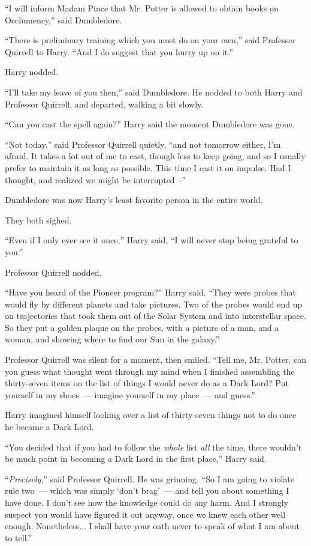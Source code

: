 ``I will inform Madam Pince that Mr. Potter is allowed to obtain books on Occlumency,'' said Dumbledore.

``There is preliminary training which you must do on your own,'' said Professor Quirrell to Harry. ``And I do suggest that you hurry up on it.''

Harry nodded.

``I'll take my leave of you then,'' said Dumbledore. He nodded to both Harry and Professor Quirrell, and departed, walking a bit slowly.

``Can you cast the spell again?'' Harry said the moment Dumbledore was gone.

``Not today,'' said Professor Quirrell quietly, ``and not tomorrow either, I'm afraid. It takes a lot out of me to cast, though less to keep going, and so I usually prefer to maintain it as long as possible. This time I cast it on impulse. Had I thought, and realized we might be interrupted~-''

Dumbledore was now Harry's least favorite person in the entire world.

They both sighed.

``Even if I only ever see it once,'' Harry said, ``I will never stop being grateful to you.''

Professor Quirrell nodded.

``Have you heard of the Pioneer program?'' Harry said. ``They were probes that would fly by different planets and take pictures. Two of the probes would end up on trajectories that took them out of the Solar System and into interstellar space. So they put a golden plaque on the probes, with a picture of a man, and a woman, and showing where to find our Sun in the galaxy.''

Professor Quirrell was silent for a moment, then smiled. ``Tell me, Mr. Potter, can you guess what thought went through my mind when I finished assembling the thirty-seven items on the list of things I would never do as a Dark Lord? Put yourself in my shoes~--- imagine yourself in my place~--- and guess.''

Harry imagined himself looking over a list of thirty-seven things not to do once he became a Dark Lord.

``You decided that if you had to follow the \emph{whole} list \emph{all} the time, there wouldn't be much point in becoming a Dark Lord in the first place,'' Harry said.

``\emph{Precisely},'' said Professor Quirrell. He was grinning. ``So I am going to violate rule two~--- which was simply `don't brag'~--- and tell you about something I have done. I don't see how the knowledge could do any harm. And I strongly suspect you would have figured it out anyway, once we knew each other well enough. Nonetheless... I shall have your oath never to speak of what I am about to tell.''

